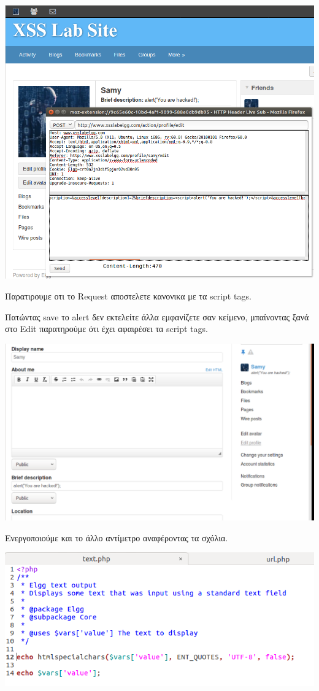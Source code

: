 \begin{center}
			\includegraphics[width=1\textwidth]{image/7.3.PNG}		
\end{center}
\noindent
Παρατιρουμε οτι το Request αποστελετε κανονικα με τα script tags.

Πατώντας save το alert δεν εκτελείτε άλλα εμφανίζετε σαν κείμενο, μπαίνοντας
ξανά στο Edit παρατηρούμε ότι έχει αφαιρέσει τα script tags.
\begin{center}
			\includegraphics[width=1\textwidth]{image/7.4.PNG}		
\end{center}
\noindent
Ενεργοποιούμε και το άλλο αντίμετρο αναφέροντας τα σχόλια.
\begin{center}
			\includegraphics[width=1\textwidth]{image/7.5.PNG}		
\end{center}

